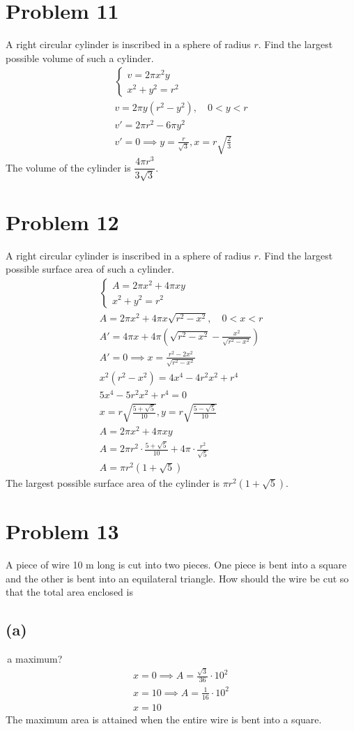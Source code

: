 \documentclass[12pt]{article}
\newcommand{\vem}{\vspace{0.5em}}
\newcommand{\problem}[1]{\section{Problem #1}}
\newcommand{\subproblem}[1]{\subsection{(#1)} \,}
\begin{document}
\problem{11}
 A right circular cylinder is inscribed in a sphere of radius $r$. Find the largest possible volume of such a
cylinder.
\begin{gather*}
    \begin{cases}
        v=2\pi x^2y\\
        x^2+y^2=r^2
    \end{cases}\\
    v=2\pi y(r^2-y^2) ,\quad 0<y<r\\
   v'=2\pi r^2-6\pi y^2\\
   v'=0 \implies \boxed{y=\frac{r}{\sqrt{3}},x=r\sqrt{\frac{2}{3}}}
\end{gather*}
The volume of the cylinder is $\dfrac{4\pi r^3}{3\sqrt{3}}$.

\problem{12}
A right circular cylinder is inscribed in a sphere of radius $r$. Find the largest possible surface area of
such a cylinder.
\begin{gather*}
    \begin{cases}
        A=2\pi x^2+4\pi xy\\
        x^2+y^2=r^2
    \end{cases}\\
    A=2\pi x^2+4\pi x\sqrt{r^2-x^2},\quad 0<x<r\\
    A'=4\pi x + 4\pi (\sqrt{r^2-x^2}-\frac{x^2}{\sqrt{r^2-x^2}})\\
    A'=0 \implies x=\frac{r^2-2x^2}{\sqrt{r^2-x^2}}\\
    x^2(r^2-x^2)=4x^4-4r^2x^2+r^4\\
    5x^4-5r^2x^2+r^4=0\\
    \boxed{x=r\sqrt{\frac{5+\sqrt{5}}{10}}, y=r\sqrt{\frac{5-\sqrt{5}}{10}}}\\
    A=2\pi x^2 + 4\pi xy\\
    A= 2 \pi r^2 \cdot \frac{5+\sqrt{5}}{10} + 4\pi \cdot \frac{r^2}{\sqrt{5}}\\
    \boxed{A=\pi r^2 (1+\sqrt{5})}
\end{gather*}
The largest possible surface area of the cylinder is $\pi r^2 (1+\sqrt{5})$.

\problem{13}
 A piece of wire 10 m long is cut into two pieces. One piece is bent into a square and the other is bent
into an equilateral triangle. How should the wire be cut so that the total area enclosed is \vem

\subproblem{a}a maximum?
\begin{gather*}
    x=0 \implies A=\frac{\sqrt{3}}{36}\cdot 10^2\\
    x=10 \implies A=\frac{1}{16}\cdot 10^2\\
    \boxed{x=10}
\end{gather*}
The maximum area is attained when the entire wire is bent into a square. \vem
\end{document}
